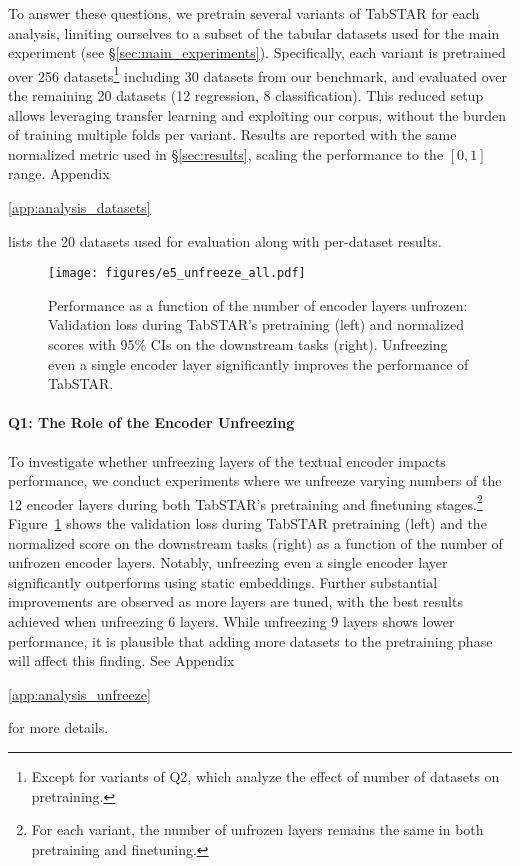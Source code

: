 \documentclass{article}
\newif\ifappendicesincluded
\newcommand{\appref}[1]{%
  \ifappendicesincluded
    \ref{#1}%
  \else
    \ref*{#1}%
  \fi
}
\begin{document}
To answer these questions, we pretrain several variants of TabSTAR for each analysis, limiting ourselves to a subset of the tabular datasets used for the main experiment (see \S\ref{sec:main_experiments}). Specifically, each variant is pretrained over 256 datasets\footnote{Except for variants of Q2, which analyze the effect of number of datasets on pretraining.} including 30 datasets from our benchmark, and evaluated over the remaining 20 datasets (12 regression, 8 classification). This reduced setup allows leveraging transfer learning and exploiting our corpus, without the burden of training multiple folds per variant. Results are reported with the same normalized metric used in \S\ref{sec:results}, scaling the performance to the $[0, 1]$ range. Appendix~\appref{app:analysis_datasets} lists the 20 datasets used for evaluation along with per-dataset results. 


\begin{figure}[h]
  \centering

    \texttt{[image: figures/e5\_unfreeze\_all.pdf]}


  \caption{Performance as a function of the number of encoder layers unfrozen: Validation loss during TabSTAR's pretraining (left) and normalized scores with 95\% CIs on the downstream tasks (right). Unfreezing even a single encoder layer significantly improves the performance of TabSTAR.}
  \label{fig:e5_pretrain}
\end{figure}

\paragraph{Q1: The Role of the Encoder Unfreezing}\label{analysis:e5_layers}
To investigate whether unfreezing layers of the textual encoder impacts performance, we conduct experiments where we unfreeze varying numbers of the 12 encoder layers during both TabSTAR's pretraining and finetuning stages.\footnote{For each variant, the number of unfrozen layers remains the same in both pretraining and finetuning.} Figure~\ref{fig:e5_pretrain} shows the validation loss during TabSTAR pretraining (left) and the normalized score on the downstream tasks (right) as a function of the number of unfrozen encoder layers. Notably, unfreezing even a single encoder layer significantly outperforms using static embeddings. Further substantial improvements are observed as more layers are tuned, with the best results achieved when unfreezing 6 layers. While unfreezing 9 layers shows lower performance, it is plausible that adding more datasets to the pretraining phase will affect this finding. See Appendix~\appref{app:analysis_unfreeze} for more details. 
\end{document}
